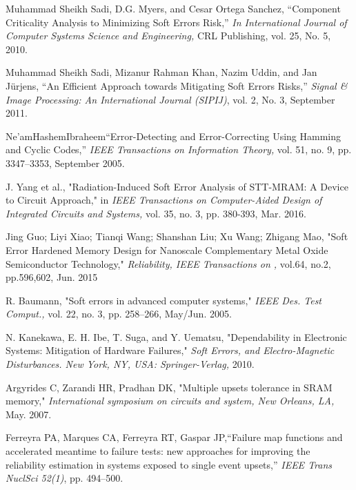 \documentclass[12pt,a4paper]{report}
\begin{document}
\begin{thebibliography}{9}

Muhammad Sheikh Sadi, D.G. Myers, and Cesar Ortega Sanchez, “Component Criticality Analysis to Minimizing Soft Errors Risk,”\textit{ In International Journal of Computer Systems Science and Engineering,} CRL Publishing, vol. 25, No. 5, 2010.

Muhammad Sheikh Sadi, Mizanur Rahman Khan, Nazim Uddin, and Jan Jürjens, “An Efficient Approach towards Mitigating Soft Errors Risks,” \textit{Signal \& Image Processing: An International Journal (SIPIJ)}, vol. 2, No. 3, September 2011.

 Ne’amHashemIbraheem“Error-Detecting and Error-Correcting Using Hamming and Cyclic Codes,” \textit{IEEE Transactions on Information Theory,} vol. 51, no. 9, pp. 3347–3353, September 2005.

J. Yang et al., "Radiation-Induced Soft Error Analysis of STT-MRAM: A Device to Circuit Approach," in \textit{IEEE Transactions on Computer-Aided Design of Integrated Circuits and Systems,} vol. 35, no. 3, pp. 380-393, Mar. 2016.

Jing Guo; Liyi Xiao; Tianqi Wang; Shanshan Liu; Xu Wang; Zhigang Mao, "Soft Error Hardened Memory Design for Nanoscale Complementary Metal Oxide Semiconductor Technology," \textit{Reliability, IEEE Transactions on ,} vol.64, no.2, pp.596,602, Jun. 2015

R. Baumann, "Soft errors in advanced computer systems," \textit{IEEE Des. Test Comput.,} vol. 22, no. 3, pp. 258–266, May/Jun. 2005.

N. Kanekawa, E. H. Ibe, T. Suga, and Y. Uematsu, "Dependability in Electronic Systems: Mitigation of Hardware Failures," \textit{Soft Errors, and Electro-Magnetic Disturbances. New York, NY, USA: Springer-Verlag,} 2010.

Argyrides C, Zarandi HR, Pradhan DK, "Multiple upsets tolerance in SRAM memory," \textit{International symposium on circuits and system, New Orleans, LA,} May. 2007.

Ferreyra PA, Marques CA, Ferreyra RT, Gaspar JP,“Failure map functions and accelerated meantime to failure tests: new approaches for improving the reliability estimation in systems exposed to single event upsets,” \textit{IEEE Trans NuclSci 52(1)}, pp. 494–500.


\end{thebibliography}
\end{document}
